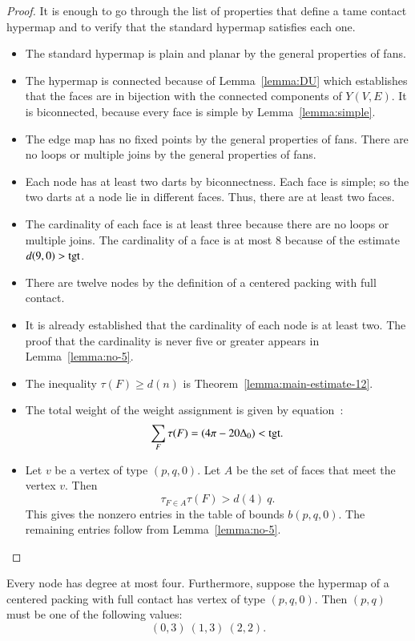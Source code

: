 \begin{proof}  It is enough to go through the list of properties that define a tame contact hypermap and to verify that the standard hypermap satisfies each one.

\begin{itemize}
\item The standard hypermap is plain and planar by the general properties of fans.
\item The hypermap is connected because of Lemma~\ref{lemma:DU} which establishes that the faces are in bijection with the connected components of $Y(V,E)$.  It is biconnected, because every face is simple by Lemma~\ref{lemma:simple}.
\item The edge map has no fixed points by the general properties of fans.  There are no loops or multiple joins by the general properties of fans.
\item  Each node has at least two darts by biconnectness. Each face is simple; so the two darts at a node lie in different faces.  Thus, there are at least two faces.
\item The cardinality of each face is at least three because there are no loops or multiple joins.  The cardinality of a face is at most $8$ because of the estimate $d(9,0)>{\operatorname{tgt}}$.  
\item There are twelve nodes by the definition of a centered packing with full contact.
\item It is already established that the cardinality of each node is at least two.  The proof that the cardinality is never five or greater appears in Lemma~\ref{lemma:no-5}.
\item The inequality $\tau(F)\ge d(n)$ is Theorem~\ref{lemma:main-estimate-12}.
\item The total weight of the weight assignment is given by equation~:
$$
\sum_F \tau(F) = (4\pi - 20\Delta_0) < {\operatorname{tgt}}.
$$
\item Let $v$ be a vertex of type $(p,q,0)$.  Let $A$ be the set of faces that meet the vertex $v$. Then 
$$
\tau_{F\in A}\tau(F) > d(4)~q.
$$
This gives the nonzero entries in the table of bounds $b(p,q,0)$.  The remaining entries follow from Lemma~\ref{lemma:no-5}.
\end{itemize}
\end{proof}




\begin{lemma}\label{lemma:no-5} 
Every node has degree at most four.
Furthermore, suppose the hypermap of a centered packing with full contact has vertex of type $(p,q,0)$.  Then $(p,q)$ must be one of the following values:
$$
(0,3)~(1,3)~(2,2).
$$
\end{lemma}

